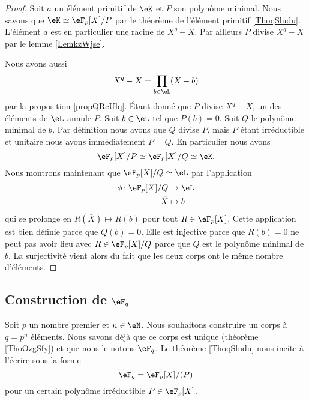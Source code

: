 \begin{proof}
    Soit \( a\) un élément primitif de \( \eK\) et \( P\) son polynôme minimal. Nous savons que \( \eK\simeq \eF_p[X]/P\) par le théorème de l'élément primitif \ref{ThoqSludu}. L'élément \( a\) est en particulier une racine de \( X^q-X\). Par ailleurs \( P\) divise \( X^q-X\) par le lemme \ref{LemkzWjse}.

    Nous avons aussi
    \begin{equation}
        X^q-X=\prod_{b\in \eL}(X-b)
    \end{equation}
    par la proposition \ref{propQRcUlq}. Étant donné que \( P\) divise \( X^q-X\), un des éléments de \( \eL\) annule \( P\). Soit \( b\in \eL\) tel que \( P(b)=0\). Soit \( Q\) le polynôme minimal de \( b\). Par définition nous avons que \( Q\) divise \( P\), mais \( P\) étant irréductible et unitaire nous avons immédiatement \( P=Q\). En particulier nous avons
    \begin{equation}
        \eF_p[X]/P\simeq\eF_p[X]/Q\simeq \eK.
    \end{equation}
    Nous montrons maintenant que \( \eF_p[X]/Q\simeq \eL\) par l'application
    \begin{equation}
        \begin{aligned}
            \phi\colon \eF_p[X]/Q&\to \eL \\
            \bar X&\mapsto b 
        \end{aligned}
    \end{equation}
    qui se prolonge en \( R(\bar X)\mapsto R(b)\) pour tout \( R\in \eF_p[X]\). Cette application est bien définie parce que \( Q(b)=0\). Elle est injective parce que \( R(b)=0\) ne peut pas avoir lieu avec \( R\in \eF_p[X]/Q\) parce que \( Q\) est le polynôme minimal de \( b\). La surjectivité vient alors du fait que les deux corps ont le même nombre d'éléments.
\end{proof}

\subsection{Construction de $\eF_q$}

Soit \( p\) un nombre premier et \( n\in \eN\). Nous souhaitons construire un corps à \( q=p^n\) éléments. Nous savons déjà que ce corps est unique (théorème \ref{ThoOzgSfy}) et que nous le notons \( \eF_q\). Le théorème \ref{ThoqSludu} nous incite à l'écrire sous la forme
\begin{equation}
    \eF_q=\eF_p[X]/(P)
\end{equation}
pour un certain polynôme irréductible \( P\in\eF_p[X]\).

